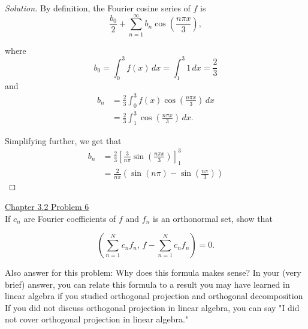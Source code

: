 \documentclass[11pt]{article}
\newenvironment{solution}
  {\renewcommand\qedsymbol{$\blacksquare$}\begin{proof}[Solution]}
  {\end{proof}}
\begin{document}
\begin{solution}
By definition, the Fourier cosine series of $f$ is \[ \frac{b_0}{2} + \sum\limits_{n=1}^{\infty} b_n \cos\left(\frac{n\pi x}{3}\right),\]

where \[b_0 = \int_{0}^{3} f(x) \, dx = \int_{1}^3 1 \, dx = \frac{2}{3}\] and 
\begin{align*} b_n &= \frac{2}{3} \int_0^3 f(x) \cos\left(\frac{n\pi x}{3}\right) \, dx \\
&= \frac{2}{3} \int_1^3 \cos\left(\frac{n\pi x}{3}\right) \, dx.\end{align*}

Simplifying further, we get that \begin{align*}b_n &= \frac{2}{3} \left[ \frac{3}{n\pi} \sin\left( \frac{n\pi x}{3}\right)\right]_1^3 \\ 
&=  \frac{2}{n\pi} \left( \sin(n\pi) - \sin\left( \frac{n\pi}{3}\right)\right)\end{align*}
\end{solution}

\underline{Chapter 3.2 Problem 6} \\

If $c_n$ are Fourier coefficients of $f$ and $f_n$ is an orthonormal set, show that

\[ \left(\sum\limits_{n=1}^N c_n f_n, \, f  - \sum\limits_{n=1}^N c_nf_n \right) = 0.\]

Also answer for this problem: Why does this formula makes sense?
In your (very brief) answer, you can relate this formula to a result you may have learned
in linear algebra if you studied orthogonal projection and orthogonal decomposition
If you did not discuss orthogonal projection in linear algebra, you can say "I did not
cover orthogonal projection in linear algebra."
\end{document}
